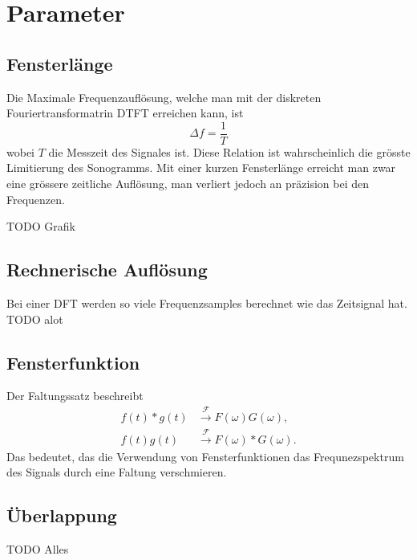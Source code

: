 %
%
%
%
\section{Parameter
\label{sonogramm:section:teil1}}

\subsection{Fensterlänge}
Die Maximale Frequenzauflösung, welche man mit der diskreten Fouriertransformatrin DTFT erreichen
kann, ist 
\begin{equation}
    \Delta f = \frac{1}{T}
\end{equation}
wobei $T$ die Messzeit des Signales ist.
Diese Relation ist wahrscheinlich die grösste Limitierung des Sonogramms.
Mit einer kurzen Fensterlänge erreicht man zwar eine grössere zeitliche Auflösung,
man verliert jedoch an präzision bei den Frequenzen.

TODO Grafik

\subsection{Rechnerische Auflösung}
Bei einer DFT werden so viele Frequenzsamples berechnet wie das
Zeitsignal hat. 
TODO alot

\subsection{Fensterfunktion}
Der Faltungssatz beschreibt 
\begin{align}
    f(t) * g(t)& \xrightarrow{\mathscr{F}} F(\omega)G(\omega),\\
    f(t) g(t)&\xrightarrow{\mathscr{F}}F(\omega) * G(\omega).
\end{align}
Das bedeutet, das die Verwendung von Fensterfunktionen das Frequnezspektrum
des Signals durch eine Faltung verschmieren.
\subsection{Überlappung}
TODO Alles


